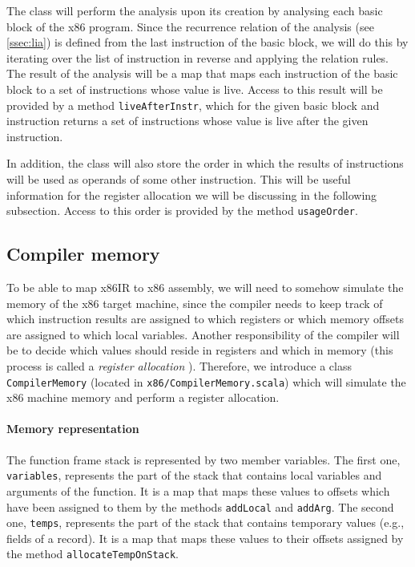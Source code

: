 \documentclass[thesis=M,english]{FITthesis}[2019/12/23]
\begin{document}
The class will perform the analysis upon its creation by analysing each basic block of the x86 program. Since the recurrence relation of the analysis (see \autoref{ssec:lia}) is defined from the last instruction of the basic block, we will do this by iterating over the list of instruction in reverse and applying the relation rules. The result of the analysis will be a map that maps each instruction of the basic block to a set of instructions whose value is live. Access to this result will be provided by a method \texttt{liveAfterInstr}, which for the given basic block and instruction returns a set of instructions whose value is live after the given instruction.

In addition, the class will also store the order in which the results of instructions will be used as operands of some other instruction. This will be useful information for the register allocation we will be discussing in the following subsection. Access to this order is provided by the method \texttt{usageOrder}.

\subsection{Compiler memory}
To be able to map x86IR to x86 assembly, we will need to somehow simulate the memory of the x86 target machine, since the compiler needs to keep track of which instruction results are assigned to which registers or which memory offsets are assigned to which local variables. Another responsibility of the compiler will be to decide which values should reside in registers and which in memory (this process is called a \emph{register allocation} \cite[Chap. 11.2]{eng_comp}). Therefore, we introduce a class \texttt{CompilerMemory} (located in \texttt{x86/CompilerMemory.scala}) which will simulate the x86 machine memory and perform a register allocation.

\paragraph*{Memory representation} The function frame stack is represented by two member variables. The first one, \texttt{variables}, represents the part of the stack that contains local variables and arguments of the function. It is a map that maps these values to offsets which have been assigned to them by the methods \texttt{addLocal} and \texttt{addArg}. The second one, \texttt{temps}, represents the part of the stack that contains temporary values (e.g., fields of a record). It is a map that maps these values to their offsets assigned by the method \texttt{allocateTempOnStack}.
\end{document}

